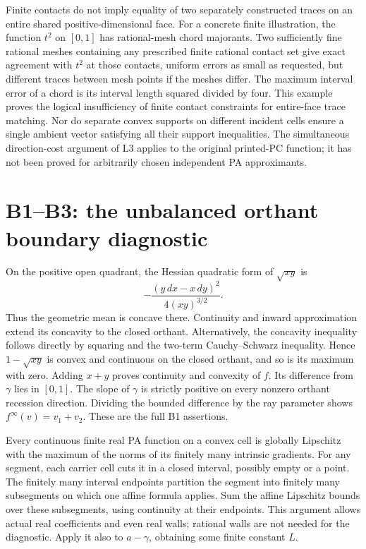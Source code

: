 \documentclass[
  11pt,
]{article}
\begin{document}
Finite contacts do not imply equality of two separately constructed
traces on an entire shared positive-dimensional face. For a concrete
finite illustration, the function \(t^2\) on \([0,1]\) has rational-mesh
chord majorants. Two sufficiently fine rational meshes containing any
prescribed finite rational contact set give exact agreement with \(t^2\)
at those contacts, uniform errors as small as requested, but different
traces between mesh points if the meshes differ. The maximum interval
error of a chord is its interval length squared divided by four. This
example proves the logical insufficiency of finite contact constraints
for entire-face trace matching. Nor do separate convex supports on
different incident cells ensure a single ambient vector satisfying all
their support inequalities. The simultaneous direction-cost argument of
L3 applies to the original printed-PC function; it has not been proved
for arbitrarily chosen independent PA approximants.

\section{B1--B3: the unbalanced orthant boundary
diagnostic}\label{b1b3-the-unbalanced-orthant-boundary-diagnostic}

On the positive open quadrant, the Hessian quadratic form of
\(\sqrt{xy}\) is \[ -\frac{(y\,dx-x\,dy)^2}{4(xy)^{3/2}}. \] Thus the
geometric mean is concave there. Continuity and inward approximation
extend its concavity to the closed orthant. Alternatively, the concavity
inequality follows directly by squaring and the two-term Cauchy--Schwarz
inequality. Hence \(1-\sqrt{xy}\) is convex and continuous on the closed
orthant, and so is its maximum with zero. Adding \(x+y\) proves
continuity and convexity of \(f\). Its difference from \(\gamma\) lies
in \([0,1]\). The slope of \(\gamma\) is strictly positive on every
nonzero orthant recession direction. Dividing the bounded difference by
the ray parameter shows \(f^\infty(v)=v_1+v_2\). These are the full B1
assertions.

Every continuous finite real PA function on a convex cell is globally
Lipschitz with the maximum of the norms of its finitely many intrinsic
gradients. For any segment, each carrier cell cuts it in a closed
interval, possibly empty or a point. The finitely many interval
endpoints partition the segment into finitely many subsegments on which
one affine formula applies. Sum the affine Lipschitz bounds over these
subsegments, using continuity at their endpoints. This argument allows
actual real coefficients and even real walls; rational walls are not
needed for the diagnostic. Apply it also to \(a-\gamma\), obtaining some
finite constant \(L\).
\end{document}
